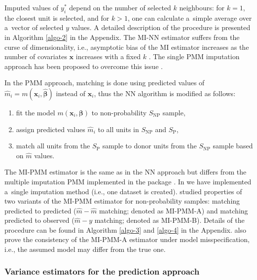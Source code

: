 \documentclass[nojss]{jss}
\begin{document}
Imputed values of \(y_i^*\) depend on the number of selected \(k\)
neighbours: for \(k=1\), the closest unit is selected, and for \(k>1\),
one can calculate a~simple average over a~vector of selected \(y\)
values. A detailed description of the procedure is presented in
Algorithm \ref{algo-2} in the Appendix. The MI-NN estimator suffers from
the curse of dimensionality, i.e., asymptotic bias of the MI estimator
increases as the number of covariates \(\boldsymbol{x}\) increases with
a fixed \(k\) \citep{abadie2006large, yang_asymptotic_2020}. The single
PMM imputation approach has been proposed to overcome this issue
\citep{chlebicki2025}.

In the PMM approach, matching is done using predicted values of
\(\hat{m}_i=m\left(\boldsymbol{x}_i, \hat{\boldsymbol{\beta}}\right)\)
instead of \(\boldsymbol{x}_i\), thus the NN algorithm is modified as
follows:

\begin{enumerate}
\item fit the model $m\left(\boldsymbol{x}_i, \boldsymbol{\beta}\right)$ to non-probability $S_{\text{NP}}$ sample, 
\item assign predicted values $\hat{m}_i$ to all units in $S_{\text{NP}}$ and $S_{\text{P}}$, 
\item match all units from the $S_{\text{P}}$ sample to donor units from the $S_{\text{NP}}$ sample based on $\hat{m}$ values. 
\end{enumerate}

The MI-PMM estimator is the same as in the NN approach but differs from
the multiple imputation PMM implemented in the  package
\citep{mice}. In  we have implemented a~single
imputation method (i.e., one dataset is created). \citet{chlebicki2025}
studied properties of two variants of the MI-PMM estimator for
non-probability samples: matching predicted to predicted
(\(\hat{m}-\hat{m}\) matching; denoted as MI-PMM-A) and matching
predicted to observed (\(\hat{m}-y\) matching; denoted as MI-PMM-B).
Details of the procedure can be found in Algorithm \ref{algo-3} and
\ref{algo-4} in the Appendix. \citet{chlebicki2025} also prove the
consistency of the MI-PMM-A estimator under model misspecification,
i.e., the assumed model may differ from the true one.

\subsubsection{Variance estimators for the prediction
approach}\label{variance-estimators-for-the-prediction-approach}
\end{document}
